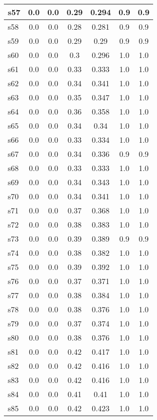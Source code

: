 \documentclass{article}
\begin{document}
\begin{tabular}{|l|c|c|c|c|c|c|}
\hline
s57 &0.0 & 0.0 & 0.29 & 0.294 & 0.9 & 0.9\\
\hline
s58 &0.0 & 0.0 & 0.28 & 0.281 & 0.9 & 0.9\\
\hline
s59 &0.0 & 0.0 & 0.29 & 0.29 & 0.9 & 0.9\\
\hline
s60 &0.0 & 0.0 & 0.3 & 0.296 & 1.0 & 1.0\\
\hline
s61 &0.0 & 0.0 & 0.33 & 0.333 & 1.0 & 1.0\\
\hline
s62 &0.0 & 0.0 & 0.34 & 0.341 & 1.0 & 1.0\\
\hline
s63 &0.0 & 0.0 & 0.35 & 0.347 & 1.0 & 1.0\\
\hline
s64 &0.0 & 0.0 & 0.36 & 0.358 & 1.0 & 1.0\\
\hline
s65 &0.0 & 0.0 & 0.34 & 0.34 & 1.0 & 1.0\\
\hline
s66 &0.0 & 0.0 & 0.33 & 0.334 & 1.0 & 1.0\\
\hline
s67 &0.0 & 0.0 & 0.34 & 0.336 & 0.9 & 0.9\\
\hline
s68 &0.0 & 0.0 & 0.33 & 0.333 & 1.0 & 1.0\\
\hline
s69 &0.0 & 0.0 & 0.34 & 0.343 & 1.0 & 1.0\\
\hline
s70 &0.0 & 0.0 & 0.34 & 0.341 & 1.0 & 1.0\\
\hline
s71 &0.0 & 0.0 & 0.37 & 0.368 & 1.0 & 1.0\\
\hline
s72 &0.0 & 0.0 & 0.38 & 0.383 & 1.0 & 1.0\\
\hline
s73 &0.0 & 0.0 & 0.39 & 0.389 & 0.9 & 0.9\\
\hline
s74 &0.0 & 0.0 & 0.38 & 0.382 & 1.0 & 1.0\\
\hline
s75 &0.0 & 0.0 & 0.39 & 0.392 & 1.0 & 1.0\\
\hline
s76 &0.0 & 0.0 & 0.37 & 0.371 & 1.0 & 1.0\\
\hline
s77 &0.0 & 0.0 & 0.38 & 0.384 & 1.0 & 1.0\\
\hline
s78 &0.0 & 0.0 & 0.38 & 0.376 & 1.0 & 1.0\\
\hline
s79 &0.0 & 0.0 & 0.37 & 0.374 & 1.0 & 1.0\\
\hline
s80 &0.0 & 0.0 & 0.38 & 0.376 & 1.0 & 1.0\\
\hline
s81 &0.0 & 0.0 & 0.42 & 0.417 & 1.0 & 1.0\\
\hline
s82 &0.0 & 0.0 & 0.42 & 0.416 & 1.0 & 1.0\\
\hline
s83 &0.0 & 0.0 & 0.42 & 0.416 & 1.0 & 1.0\\
\hline
s84 &0.0 & 0.0 & 0.41 & 0.41 & 1.0 & 1.0\\
\hline
s85 &0.0 & 0.0 & 0.42 & 0.423 & 1.0 & 1.0\\

\end{tabular}
\end{document}
